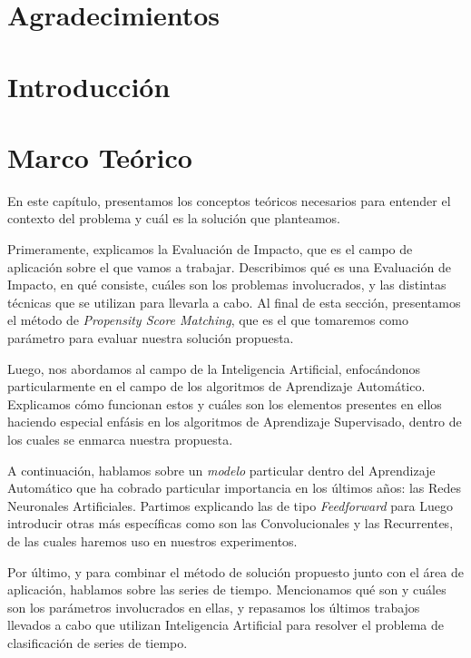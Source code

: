 \documentclass[a4paper,12pt,spanish]{book}
\begin{document}


\cleardoublepage


\clearpage

\thispagestyle{empty}
\chapter*{Agradecimientos}
\clearpage

\tableofcontents
\clearpage

\chapter{Introducción}


\chapter{Marco Teórico}
En este capítulo, presentamos los conceptos teóricos necesarios para entender el contexto
del problema y cuál es la solución que planteamos.

Primeramente, explicamos la Evaluación de Impacto, que es el campo de aplicación sobre el
que vamos a trabajar. Describimos qué es una Evaluación de Impacto, en qué consiste,
cuáles son los problemas involucrados, y las distintas técnicas que se utilizan para
llevarla a cabo. Al final de esta sección, presentamos el método de \textit{Propensity
Score Matching}, que es el que tomaremos como parámetro para evaluar nuestra solución
propuesta.

Luego, nos abordamos al campo de la Inteligencia Artificial, enfocándonos particularmente
en el campo de los algoritmos de Aprendizaje Automático. Explicamos cómo funcionan estos y
cuáles son los elementos presentes en ellos haciendo especial enfásis en los algoritmos de
Aprendizaje Supervisado, dentro de los cuales se enmarca nuestra propuesta.

A continuación, hablamos sobre un \textit{modelo} particular dentro del Aprendizaje
Automático que ha cobrado particular importancia en los últimos años: las Redes Neuronales
Artificiales. Partimos explicando las de tipo \textit{Feedforward} para Luego introducir
otras más específicas como son las Convolucionales y las Recurrentes, de las cuales
haremos uso en nuestros experimentos.

Por último, y para combinar el método de solución propuesto junto con el área de
aplicación, hablamos sobre las series de tiempo. Mencionamos qué son y cuáles son los
parámetros involucrados en ellas, y repasamos los últimos trabajos llevados a cabo que
utilizan Inteligencia Artificial para resolver el problema de clasificación de series de
tiempo.
\end{document}
